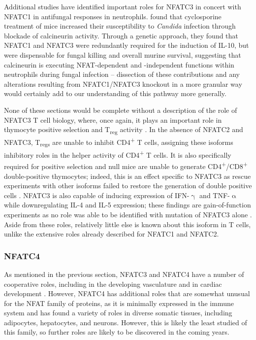 Additional studies have identified important roles for NFATC3 in concert with NFATC1 in antifungal responses in neutrophils. \citet{Greenblatt2010} found that cyclosporine treatment of mice increased their susceptibility to \textit{Candida} infection through blockade of calcineurin activity. Through a genetic approach, they found that NFATC1 and NFATC3 were redundantly required for the induction of IL\hyp{}10, but were dispensable for fungal killing and overall murine survival, suggesting that calcineurin is executing NFAT\hyp{}dependent and \hyp{}independent functions within neutrophils during fungal infection -- dissection of these contributions and any alterations resulting from NFATC1/NFATC3 knockout in a more granular way would certainly add to our understanding of this pathway more generally.

None of these sections would be complete without a description of the role of NFATC3 T cell biology, where, once again, it plays an important role in thymocyte positive selection and T\textsubscript{reg} activity \citep{Ho1995, Bopp2005}. In the absence of NFATC2 and NFATC3, T\textsubscript{regs} are unable to inhibit CD4\textsuperscript{+} T cells, assigning these isoforms inhibitory roles in the helper activity of CD4\textsuperscript{+} T cells. It is also specifically required for positive selection and null mice are unable to generate CD4\textsuperscript{+}/CD8\textsuperscript{+} double\hyp{}positive thymocytes; indeed, this is an effect specific to NFATC3 as rescue experiments with other isoforms failed to restore the generation of double positive cells \citep{CanteBarrett2007}. NFATC3 is also capable of inducing expression of IFN\hyp{}$\upgamma$  and TNF\hyp{}$\upalpha$ while downregulating IL\hyp{}4 and IL\hyp{}5 expression; these findings are gain\hyp{}of\hyp{}function experiments as no role was able to be identified with mutation of NFATC3 alone \citep{Chen2003}. Aside from these roles, relatively little else is known about this isoform in T cells, unlike the extensive roles already described for NFATC1 and NFATC2.

\subsubsection{NFATC4}\label{nfatc4}

As mentioned in the previous section, NFATC3 and NFATC4 have a number of cooperative roles, including in the developing vasculature and in cardiac development \citep{Graef2001, Bushdid2003}. However, NFATC4 has additional roles that are somewhat unusual for the NFAT family of proteins, as it is minimally expressed in the immune system and has found a variety of roles in diverse somatic tissues, including adipocytes, hepatocytes, and neurons. However, this is likely the least studied of this family, so further roles are likely to be discovered in the coming years.

